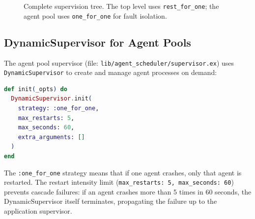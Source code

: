 \documentclass[12pt,a4paper]{article}
\theoremstyle{definition}
\theoremstyle{remark}
\begin{document}
\begin{figure}[H]
\centering
{}
\caption{Complete supervision tree. The top level uses \texttt{rest\_for\_one}; the agent pool uses \texttt{one\_for\_one} for fault isolation.}\label{fig:supervision-tree}
\end{figure}

\subsection{DynamicSupervisor for Agent Pools}

The agent pool supervisor (file: \texttt{lib/agent\_scheduler/supervisor.ex}) uses \texttt{DynamicSupervisor} to create and manage agent processes on demand:

\begin{lstlisting}[language=elixir, caption={DynamicSupervisor with restart intensity (from \texttt{supervisor.ex})}, label={lst:dynsup}]
def init(_opts) do
  DynamicSupervisor.init(
    strategy: :one_for_one,
    max_restarts: 5,
    max_seconds: 60,
    extra_arguments: []
  )
end
\end{lstlisting}

The \texttt{:one\_for\_one} strategy means that if one agent crashes, only that agent is restarted. The restart intensity limit (\texttt{max\_restarts: 5, max\_seconds: 60}) prevents cascade failures: if an agent crashes more than 5 times in 60 seconds, the DynamicSupervisor itself terminates, propagating the failure up to the application supervisor.
\end{document}
